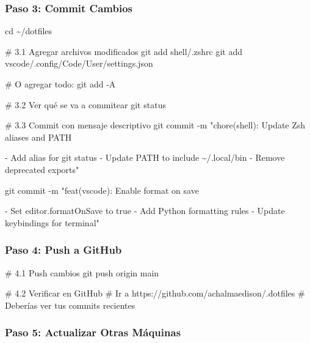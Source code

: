 \documentclass[
  doc,
  floatsintext,
  longtable,
  a4paper,
  nolmodern,
  notxfonts,
  notimes,
  12pt,
  colorlinks=true,linkcolor=blue,citecolor=blue,urlcolor=blue]{apa7}
\newenvironment{Shaded}{\begin{snugshade}}{\end{snugshade}}
\newcommand{\AttributeTok}[1]{\textcolor[rgb]{0.40,0.45,0.13}{#1}}
\newcommand{\BuiltInTok}[1]{\textcolor[rgb]{0.00,0.23,0.31}{#1}}
\newcommand{\CommentTok}[1]{\textcolor[rgb]{0.37,0.37,0.37}{#1}}
\newcommand{\FunctionTok}[1]{\textcolor[rgb]{0.28,0.35,0.67}{#1}}
\newcommand{\NormalTok}[1]{\textcolor[rgb]{0.00,0.23,0.31}{#1}}
\newcommand{\StringTok}[1]{\textcolor[rgb]{0.13,0.47,0.30}{#1}}
\begin{document}
\subsubsection{Paso 3: Commit Cambios}\label{paso-3-commit-cambios}

\begin{Shaded}
\begin{Highlighting}[]
\BuiltInTok{cd}\NormalTok{ \textasciitilde{}/dotfiles}

\CommentTok{\# 3.1 Agregar archivos modificados}
\FunctionTok{git}\NormalTok{ add shell/.zshrc}
\FunctionTok{git}\NormalTok{ add vscode/.config/Code/User/settings.json}

\CommentTok{\# O agregar todo:}
\FunctionTok{git}\NormalTok{ add }\AttributeTok{{-}A}

\CommentTok{\# 3.2 Ver qué se va a commitear}
\FunctionTok{git}\NormalTok{ status}

\CommentTok{\# 3.3 Commit con mensaje descriptivo}
\FunctionTok{git}\NormalTok{ commit }\AttributeTok{{-}m} \StringTok{"chore(shell): Update Zsh aliases and PATH}

\StringTok{{-} Add alias for git status}
\StringTok{{-} Update PATH to include \textasciitilde{}/.local/bin}
\StringTok{{-} Remove deprecated exports"}

\FunctionTok{git}\NormalTok{ commit }\AttributeTok{{-}m} \StringTok{"feat(vscode): Enable format on save}

\StringTok{{-} Set editor.formatOnSave to true}
\StringTok{{-} Add Python formatting rules}
\StringTok{{-} Update keybindings for terminal"}
\end{Highlighting}
\end{Shaded}

\subsubsection{Paso 4: Push a GitHub}\label{paso-4-push-a-github}

\begin{Shaded}
\begin{Highlighting}[]
\CommentTok{\# 4.1 Push cambios}
\FunctionTok{git}\NormalTok{ push origin main}

\CommentTok{\# 4.2 Verificar en GitHub}
\CommentTok{\# Ir a https://github.com/achalmaedison/.dotfiles}
\CommentTok{\# Deberías ver tus commits recientes}
\end{Highlighting}
\end{Shaded}

\subsubsection{Paso 5: Actualizar Otras
Máquinas}\label{paso-5-actualizar-otras-muxe1quinas}
\end{document}
